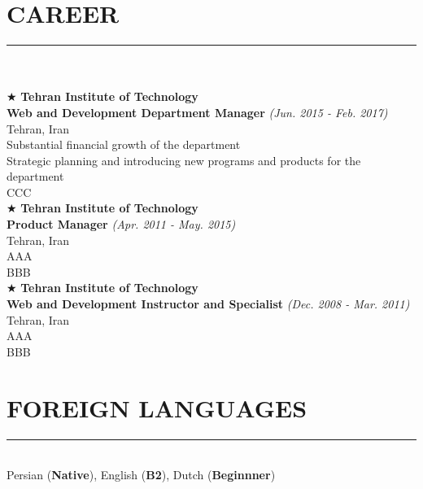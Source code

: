 \documentclass[10pt,a4paper]{article}
\begin{document}
\section{CAREER}
\noindent\rule {18.0cm}{0.2pt} \\ \\
$\bigstar$ \hspace{0.1cm} \large \textbf{Tehran Institute of Technology} \\
\indent \small \textbf{Web and Development Department Manager} \textsl{(Jun. 2015 - Feb. 2017)} \\
\indent \textnormal{Tehran, Iran} \\
\indent \textbullet \hspace{0.05cm} Substantial financial growth of the department \\
\indent \textbullet \hspace{0.05cm} Strategic planning and introducing new programs and products for the department \\
\indent \textbullet \hspace{0.05cm} CCC \\

\noindent $\bigstar$ \hspace{0.1cm} \large \textbf{Tehran Institute of Technology} \\
\indent \small \textbf{Product Manager} \textsl{(Apr. 2011 - May. 2015)} \\
\indent \textnormal{Tehran, Iran} \\
\indent \textbullet \hspace{0.05cm} AAA \\
\indent \textbullet \hspace{0.05cm} BBB \\

\noindent $\bigstar$ \hspace{0.1cm} \large \textbf{Tehran Institute of Technology} \\
\indent \small \textbf{Web and Development Instructor and Specialist} \textsl{(Dec. 2008 - Mar. 2011)} \\
\indent \textnormal{Tehran, Iran} \\
\indent \textbullet \hspace{0.05cm} AAA \\
\indent \textbullet \hspace{0.05cm} BBB \\
    
\section{FOREIGN LANGUAGES}
\noindent \rule {18.0cm}{0.2pt} \\
    Persian (\textbf{Native}), English (\textbf{B2}), Dutch (\textbf{Beginnner}) \\
\end{document}

